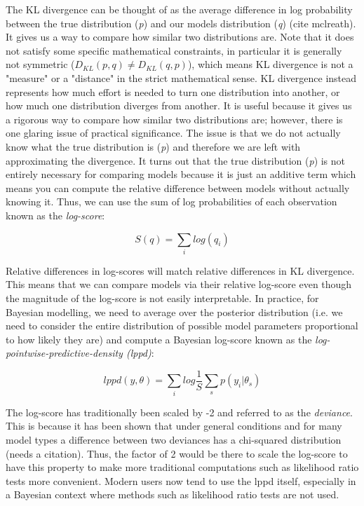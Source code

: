 The KL divergence can be thought of as the average difference in log probability between the true distribution (\textit{p}) and our models distribution (\textit{q}) (cite mclreath). It gives us a way to compare how similar two distributions are. Note that it does not satisfy some specific mathematical constraints, in particular it is generally not symmetric ($D_{KL}(p,q) \neq D_{KL}(q,p)$), which means KL divergence is not a "measure" or a "distance" in the strict mathematical sense. KL divergence instead represents how much effort is needed to turn one distribution into another, or how much one distribution diverges from another. It is useful because it gives us a rigorous way to compare how similar two distributions are; however, there is one glaring issue of practical significance. The issue is that we do not actually know what the true distribution is (\textit{p}) and therefore we are left with approximating the divergence. It turns out that the true distribution (\textit{p}) is not entirely necessary for comparing models because it is just an additive term which means you can compute the relative difference between models without actually knowing it. Thus, we can use the sum of log probabilities of each observation known as the \textit{log-score}:

\begin{equation}
S(q) = \sum_i log(q_i)
\end{equation}

Relative differences in log-scores will match relative differences in KL divergence. This means that we can compare models via their relative log-score even though the magnitude of the log-score is not easily interpretable. In practice, for Bayesian modelling, we need to average over the posterior distribution (i.e. we need to consider the entire distribution of possible model parameters proportional to how likely they are) and compute a Bayesian log-score known as the \textit{log-pointwise-predictive-density (lppd)}:

\begin{equation} \label{eq:lppd}
lppd(y, \theta) = \sum_i log \frac{1}{S} \sum_s p(y_i | \theta_s)
\end{equation}

The log-score has traditionally been scaled by -2 and referred to as the \textit{deviance}. This is because it has been shown that under general conditions and for many model types a difference between two deviances has a chi-squared distribution (needs a citation). Thus, the factor of 2 would be there to scale the log-score to have this property to make more traditional computations such as likelihood ratio tests more convenient. Modern users now tend to use the lppd itself, especially in a Bayesian context where methods such as likelihood ratio tests are not used.

